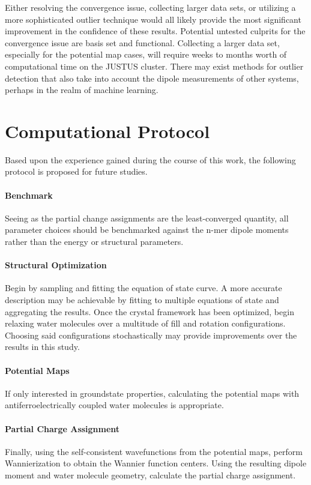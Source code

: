 Either resolving the convergence issue, collecting larger data sets, or utilizing a more sophisticated outlier technique would all likely provide the most significant improvement in the confidence of these results. Potential untested culprits for the convergence issue are basis set and functional. Collecting a larger data set, especially for the potential map cases, will require weeks to months worth of computational time on the JUSTUS cluster. There may exist methods for outlier detection that also take into account the dipole measurements of other systems, perhaps in the realm of machine learning.

\section{Computational Protocol}

Based upon the experience gained during the course of this work, the following protocol is proposed for future studies. 

\paragraph{Benchmark} Seeing as the partial change assignments are the least-converged quantity, all parameter choices should be benchmarked against the n-mer dipole moments rather than the energy or structural parameters.

\paragraph{Structural Optimization} Begin by sampling and fitting the equation of state curve. A more accurate description may be achievable by fitting to multiple equations of state and aggregating the results. Once the crystal framework has been optimized, begin relaxing water molecules over a multitude of fill and rotation configurations. Choosing said configurations stochastically may provide improvements over the results in this study. 

\paragraph{Potential Maps} If only interested in groundstate properties, calculating the potential maps with antiferroelectrically coupled water molecules is appropriate.

\paragraph{Partial Charge Assignment} Finally, using the self-consistent wavefunctions from the potential maps, perform Wannierization to obtain the Wannier function centers. Using the resulting dipole moment and water molecule geometry, calculate the partial charge assignment.

